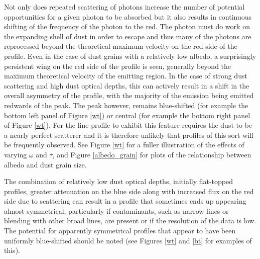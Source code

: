 \documentclass[useAMS,usenatbib,usegraphicx]{mnras}
\begin{document}
Not only does 
repeated scattering of photons increase the number of potential 
opportunities for a given photon to be absorbed but it also results in 
continuous shifting of the frequency of the photon to the red.  The photon 
must do work on the expanding shell of dust in order to escape and thus 
many of the photons are reprocessed beyond the theoretical maximum 
velocity on the red side of the profile.  Even in the case of dust grains 
with a relatively low albedo, a surprisingly persistent wing on the red 
side of the profile is seen, generally beyond the maximum theoretical velocity 
of the emitting region. In the case of strong 
dust scattering and high dust optical depths, this can actively result in a 
shift in the overall asymmetry of the profile, with the majority of the 
emission being emitted redwards of the peak.
The peak however, remains blue-shifted (for example the bottom left panel of Figure \ref{wt}) or central (for example the bottom right panel of Figure \ref{wt}).  
For the line profile to exhibit this feature requires the dust to be a 
nearly perfect scatterer and it is therefore unlikely that profiles of this sort will be
frequently observed.  See Figure \ref{wt} for a fuller illustration of the effects of varying
$\omega$ and $\tau$, and Figure \ref{albedo_grain} for plots of the relationship between albedo and dust grain size.

The combination of relatively low dust optical depths, initially flat-topped 
profiles, greater attenuation on the blue side along with increased flux on the 
red side due to scattering can result in a profile that sometimes  ends up appearing 
almost symmetrical, particularly if 
contaminants, such as narrow lines or blending with other broad lines, are 
present or if the resolution of the data is low.  The potential for apparently 
symmetrical profiles that appear to have been uniformly blue-shifted 
should be noted (see Figures \ref{wt} and \ref{bt}  for examples of this).



\end{document}
